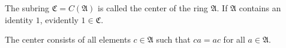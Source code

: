 The subring $\mathfrak{C} = C(\mathfrak{A})$ is called the center of the ring $\mathfrak{A}$. If $\mathfrak{A}$ contains an identity $1$, evidently $1 \in \mathfrak{C}$.

The center consists of all elements $c \in \mathfrak{A}$ such that $ca = ac$ for all $a \in \mathfrak{A}$.
